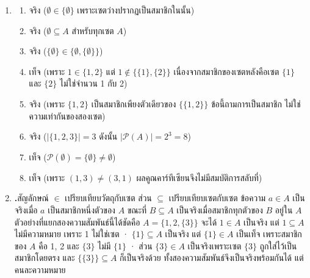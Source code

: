 \begin{enumerate}[series=anskey,label={},ref=\arabic*,leftmargin=0pt,itemsep=0.6em]
    \item
    \begin{enumerate}[label=\textbf{\thechapter.\arabic{enumi}.\arabic*}]
        \item จริง ($\emptyset \in \{\emptyset\}$ เพราะเซตว่างปรากฏเป็นสมาชิกในนั้น)
        \item จริง ($\emptyset \subseteq A$ สำหรับทุกเซต $A$)
        \item จริง ($\{\emptyset\} \in \{\emptyset, \{\emptyset\}\}$)
        \item เท็จ (เพราะ $1 \in \{1,2\}$ แต่ $1 \notin \{\{1\}, \{2\}\}$ เนื่องจากสมาชิกของเซตหลังคือเซต $\{1\}$ และ $\{2\}$ ไม่ใช่จำนวน 1 กับ 2)
        \item จริง (เพราะ $\{1,2\}$ เป็นสมาชิกเพียงตัวเดียวของ $\{\{1,2\}\}$ ข้อนี้ถามการเป็นสมาชิก ไม่ใช่ความเท่ากันของสองเซต)
        \item จริง ($|\{1, 2, 3\}| = 3$ ดังนั้น $|\mathcal{P}(A)| = 2^3 = 8$)
        \item เท็จ ($\mathcal{P}(\emptyset) = \{\emptyset\} \neq \emptyset$)
        \item เท็จ (เพราะ $(1, 3) \neq (3, 1)$ ผลคูณคาร์ทีเซียนจึงไม่มีสมบัติการสลับที่)
    \end{enumerate}

    \item \textbf{\thechapter.\theenumi}\quad สัญลักษณ์ $\in$ เปรียบเทียบวัตถุกับเซต ส่วน $\subseteq$ เปรียบเทียบเซตกับเซต ข้อความ $a \in A$ เป็นจริงเมื่อ $a$ เป็นสมาชิกหนึ่งตัวของ $A$ ขณะที่ $B \subseteq A$ เป็นจริงเมื่อสมาชิกทุกตัวของ $B$ อยู่ใน $A$ ตัวอย่างที่แยกสองความสัมพันธ์นี้ได้ชัดคือ $A = \{1, 2, \{3\}\}$ จะได้ $1 \in A$ เป็นจริง แต่ $1 \subseteq A$ ไม่มีความหมาย เพราะ 1 ไม่ใช่เซต · $\{1\} \subseteq A$ เป็นจริง แต่ $\{1\} \in A$ เป็นเท็จ เพราะสมาชิกของ $A$ คือ 1, 2 และ $\{3\}$ ไม่มี $\{1\}$ · ส่วน $\{3\} \in A$ เป็นจริงเพราะเซต $\{3\}$ ถูกใส่ไว้เป็นสมาชิกโดยตรง และ $\{\{3\}\} \subseteq A$ ก็เป็นจริงด้วย ทั้งสองความสัมพันธ์จึงเป็นจริงพร้อมกันได้ แต่คนละความหมาย
\end{enumerate}

